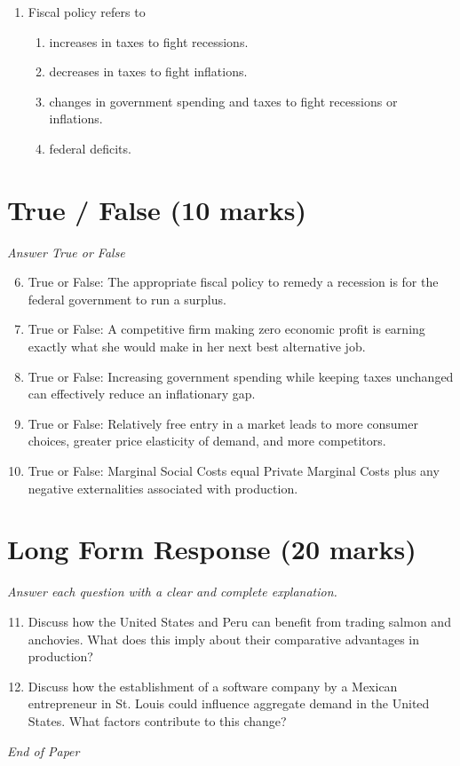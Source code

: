 \documentclass[12pt]{article}
\begin{document}
\begin{enumerate}[label=\arabic*.]
\begin{enumerate}[label=(\alph*)]
    \item AVC and ATC intersect MC at its minimum point.
\end{enumerate}
\item Fiscal policy refers to
\begin{enumerate}[label=(\alph*)]
    \item increases in taxes to fight recessions.
    \item decreases in taxes to fight inflations.
    \item changes in government spending and taxes to fight recessions or inflations.
    \item federal deficits.
\end{enumerate}
\end{enumerate}

\section*{True / False (10 marks)}
\textit{Answer True or False}
\begin{enumerate}[label=\arabic*.]
\setcounter{enumi}{5}
\item True or False: The appropriate fiscal policy to remedy a recession is for the federal government to run a surplus.
\item True or False: A competitive firm making zero economic profit is earning exactly what she would make in her next best alternative job.
\item True or False: Increasing government spending while keeping taxes unchanged can effectively reduce an inflationary gap.
\item True or False: Relatively free entry in a market leads to more consumer choices, greater price elasticity of demand, and more competitors.
\item True or False: Marginal Social Costs equal Private Marginal Costs plus any negative externalities associated with production.
\end{enumerate}

\section*{Long Form Response (20 marks)}
\textit{Answer each question with a clear and complete explanation.}
\begin{enumerate}[label=\arabic*.]
\setcounter{enumi}{10}
\item Discuss how the United States and Peru can benefit from trading salmon and anchovies. What does this imply about their comparative advantages in production?
\item Discuss how the establishment of a software company by a Mexican entrepreneur in St. Louis could influence aggregate demand in the United States. What factors contribute to this change?
\end{enumerate}

\vfill
\noindent\textit{End of Paper}
\end{document}
